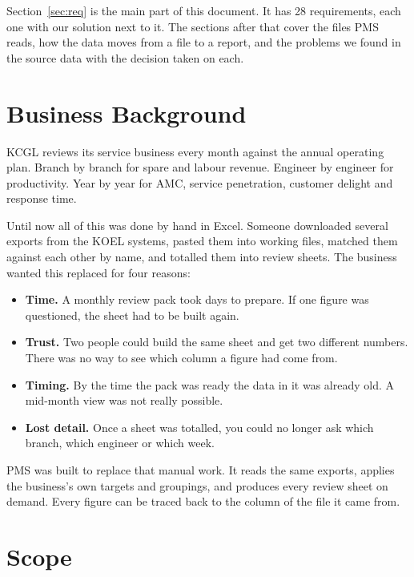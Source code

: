 \documentclass[11pt,a4paper]{article}
\begin{document}
Section~\ref{sec:req} is the main part of this document. It has 28 requirements, each one
with our solution next to it. The sections after that cover the files PMS reads, how the
data moves from a file to a report, and the problems we found in the source data with the
decision taken on each.

\section{Business Background}

KCGL reviews its service business every month against the annual operating plan. Branch
by branch for spare and labour revenue. Engineer by engineer for productivity. Year by
year for AMC, service penetration, customer delight and response time.

Until now all of this was done by hand in Excel. Someone downloaded several exports from
the KOEL systems, pasted them into working files, matched them against each other by
name, and totalled them into review sheets. The business wanted this replaced for four
reasons:

\begin{itemize}
  \item \textbf{Time.} A monthly review pack took days to prepare. If one figure was
  questioned, the sheet had to be built again.
  \item \textbf{Trust.} Two people could build the same sheet and get two different
  numbers. There was no way to see which column a figure had come from.
  \item \textbf{Timing.} By the time the pack was ready the data in it was already old. A
  mid-month view was not really possible.
  \item \textbf{Lost detail.} Once a sheet was totalled, you could no longer ask which
  branch, which engineer or which week.
\end{itemize}

PMS was built to replace that manual work. It reads the same exports, applies the
business's own targets and groupings, and produces every review sheet on demand. Every
figure can be traced back to the column of the file it came from.

\section{Scope}
\end{document}
